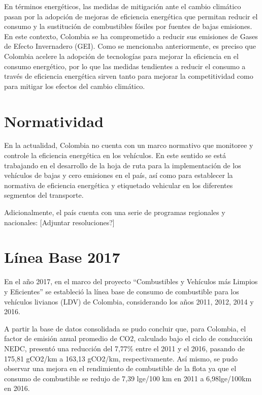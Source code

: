 En términos energéticos, las medidas de mitigación ante el cambio climático pasan por la adopción de mejoras de eficiencia energética que permitan reducir el consumo y la sustitución de combustibles fósiles por fuentes de bajas emisiones. En este contexto, Colombia se ha comprometido a reducir sus emisiones de Gases de Efecto Invernadero (GEI). \cite{Plan_Energetico-2050} Como se mencionaba anteriormente, es preciso que Colombia acelere la adopción de tecnologías para mejorar la eficiencia en el consumo energético, por lo que las medidas tendientes a reducir el consumo a través de eficiencia energética sirven tanto para mejorar la competitividad como para mitigar los efectos del cambio climático.



\section{Normatividad}

En la actualidad, Colombia no cuenta con un marco normativo que monitoree y controle la eficiencia energética en los vehículos. En este sentido se está trabajando en el desarrollo de la hoja de ruta para la implementación de los vehículos de bajas y cero emisiones en el país, así como para establecer la normativa de eficiencia energética y etiquetado vehicular en los diferentes segmentos del transporte. \cite{Baseline_Pereira_2020}

Adicionalmente, el país cuenta con una serie de programas regionales y nacionales: \label{Comentario}[Adjuntar resoluciones?]

\section{Línea Base 2017}

En el año 2017, en el marco del proyecto “Combustibles y Vehículos más Limpios y Eficientes” se estableció la línea base de consumo de combustible para los vehículos livianos (LDV) de Colombia, considerando los años 2011, 2012, 2014 y 2016. \cite{Baseline_Pereira_2020}

A partir la base de datos consolidada se pudo concluir que, para Colombia, el factor de emisión anual promedio de CO2, calculado bajo el ciclo de conducción NEDC, presentó una reducción del 7,77\% entre el 2011 y el 2016, pasando de 175,81 gCO2/km a 163,13 gCO2/km, respectivamente. Así mismo, se pudo observar una mejora en el rendimiento de combustible de la flota ya que el consumo de combustible se redujo de 7,39 lge/100 km en 2011 a 6,98lge/100km en 2016.\cite{Baseline_Pereira_2020}

